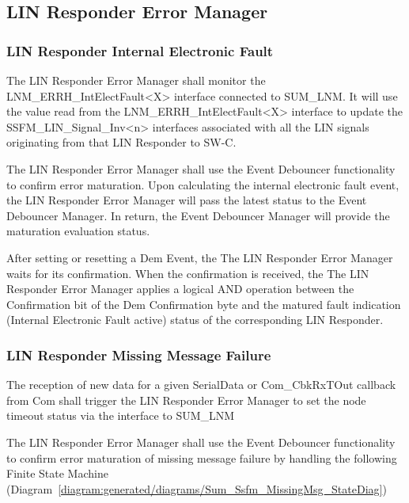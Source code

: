 {       }

\subsection{LIN Responder Error Manager}
\subsubsection{LIN Responder Internal Electronic Fault}
The LIN Responder Error Manager shall monitor the LNM_ERRH_IntElectFault<X> interface connected to SUM_LNM. 
It will use the value read from the LNM_ERRH_IntElectFault<X> interface to update the SSFM_LIN_Signal_Inv<n> interfaces associated with all the LIN signals originating from that LIN Responder to SW-C.

The LIN Responder Error Manager shall use the Event Debouncer functionality to confirm error maturation. 
Upon calculating the internal electronic fault event, the LIN Responder Error Manager will pass the latest status to the Event Debouncer Manager. 
In return, the Event Debouncer Manager will provide the maturation evaluation status.

After setting or resetting a Dem Event, the The LIN Responder Error Manager waits for its confirmation.
When the confirmation is received, the The LIN Responder Error Manager applies a logical AND operation between the Confirmation bit of the Dem Confirmation byte 
and the matured fault indication (Internal Electronic Fault active) status of the corresponding LIN Responder.

{   }

\subsubsection{LIN Responder Missing Message Failure}
The reception of new data for a given SerialData or Com_CbkRxTOut callback from Com shall trigger the LIN Responder Error Manager to set the node timeout status via the interface  to SUM\_LNM
 
The LIN Responder Error Manager shall use the Event Debouncer functionality to confirm error maturation of missing message failure by handling 
the following Finite State Machine (Diagram~\ref{diagram:generated/diagrams/Sum_Ssfm_MissingMsg_StateDiag})

